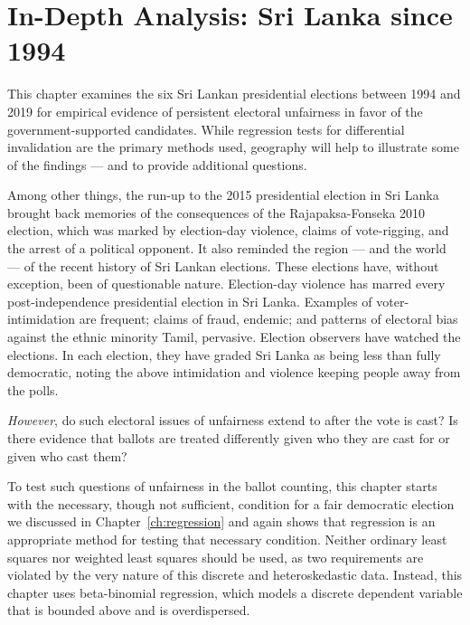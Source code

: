 \chapter{In-Depth Analysis: Sri Lanka since 1994}\label{ch:sri}


\begin{extract}
This chapter examines the six Sri Lankan presidential elections between 1994 and 2019 for empirical evidence of persistent electoral unfairness in favor of the government-supported candidates. While regression tests for differential invalidation are the primary methods used, geography will help to illustrate some of the findings --- and to provide additional questions.
\end{extract}







%
\noindent
Among other things, the run-up to the 2015 presidential election in Sri Lanka brought back memories of the consequences of the Rajapaksa-Fonseka 2010 election, which was marked by election-day violence, claims of vote-rigging, and the arrest of a political opponent.\cite{afp-2015,cmev-2010,hrw-2015} It also reminded the region --- and the world --- of the recent history of Sri Lankan elections. These elections have, without exception, been of questionable nature. Election-day violence has marred every post-independence presidential election in Sri Lanka.\cite{gross-2000,sri-lanka-brief-2018} Examples of voter-intimidation are frequent; claims of fraud, endemic; and patterns of electoral bias against the ethnic minority Tamil, pervasive.\cite{afp-2015, gulf-times-2013, hensman-2010, hrw-2015,samarasinghe-1989} Election observers have watched the elections. In each election, they have graded Sri Lanka as being less than fully democratic, noting the above intimidation and violence keeping people away from the polls.\cite{chellaney-2018, EU-2004, fh-2016}


\emph{However}, do such electoral issues of unfairness extend to after the vote is cast? Is there evidence that ballots are treated differently given who they are cast for or given who cast them?


To test such questions of unfairness in the ballot counting, this chapter starts with the necessary, though not sufficient, condition for a fair democratic election we discussed in Chapter~\ref{ch:regression} and again shows that regression is an appropriate method for testing that necessary condition. Neither ordinary least squares nor weighted least squares should be used, as two requirements are violated by the very nature of this discrete and heteroskedastic data.\cite{mebane-sekhon-2004} Instead, this chapter uses beta-binomial regression, which models a discrete dependent variable that is bounded above and is overdispersed.\cite{yee-2015,yee-wild-1996}

